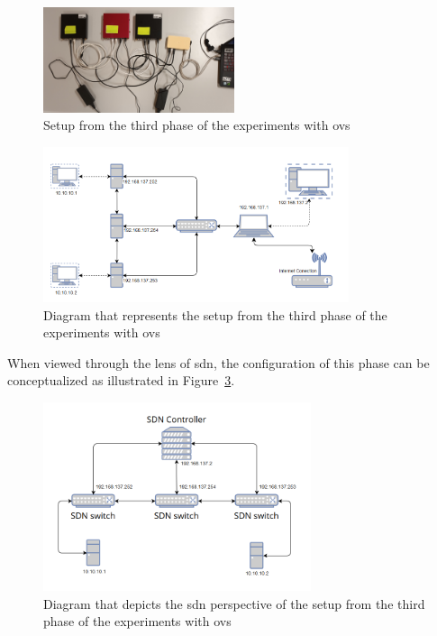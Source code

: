 \begin{figure}
	\centering
	\includegraphics[width=0.5\textwidth]{Chapters/Figures/tests/ovs_phase_3/setup.jpg}
	\caption{Setup from the third phase of the experiments with \gls{ovs}}
	\label{fig:exp1_phase3_setup}
\end{figure}

\begin{figure}
	\centering
	\includegraphics[width=0.8\textwidth]{Chapters/Figures/tests/ovs_phase_4/setup_diagram.PNG}
	\caption{Diagram that represents the setup from the third phase of the experiments with \gls{ovs}}
	\label{fig:exp1_phase4_diagram}
\end{figure}


When viewed through the lens of \gls{sdn}, the configuration of this phase can be conceptualized as illustrated in Figure~\ref{fig:exp1_phase4_sdn_diagram}.

\begin{figure}
	\centering
	\includegraphics[width=0.7\textwidth]{Chapters/Figures/tests/ovs_phase_4/sdn_diagram.PNG}
	\caption{Diagram that depicts the \gls{sdn} perspective of the setup from the third phase of the experiments with \gls{ovs}}
	\label{fig:exp1_phase4_sdn_diagram}
\end{figure}



